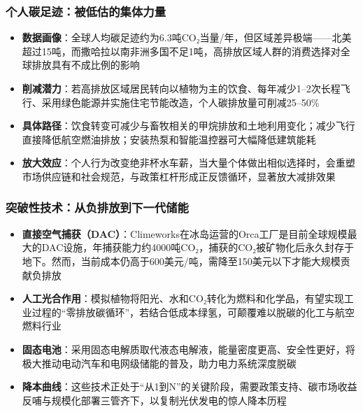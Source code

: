 \documentclass[11pt]{beamer}
\begin{document}
\begin{frame}\frametitle{个人碳足迹：被低估的集体力量}
\begin{itemize}
  \item \textbf{数据画像}：全球人均碳足迹约为\alert{6.3吨CO₂当量/年}，但区域差异极端——北美超过15吨，而撒哈拉以南非洲多国不足1吨，高排放区域人群的消费选择对全球排放具有不成比例的影响
  \item \textbf{削减潜力}：若高排放区域居民转向以\alert{植物为主的饮食}、每年减少1–2次长程飞行、采用绿色能源并实施住宅节能改造，个人碳排放量可削减\alert{25–50\%}
  \item \textbf{具体路径}：饮食转变可减少与畜牧相关的甲烷排放和土地利用变化；减少飞行直接降低航空燃油排放；安装热泵和智能温控器可大幅降低建筑能耗
  \item \textbf{放大效应}：个人行为改变绝非杯水车薪，当大量个体做出相似选择时，会重塑市场供应链和社会规范，与政策杠杆形成\alert{正反馈循环}，显著放大减排效果
\end{itemize}
\end{frame}

\begin{frame}\frametitle{突破性技术：从负排放到下一代储能}
\begin{itemize}
  \item \textbf{直接空气捕获（DAC）}：Climeworks在冰岛运营的Orca工厂是目前全球规模最大的DAC设施，年捕获能力约\alert{4000吨CO₂}，捕获的CO₂被矿物化后永久封存于地下。然而，当前成本仍高于\alert{600美元/吨}，需降至150美元以下才能大规模贡献负排放
  \item \textbf{人工光合作用}：模拟植物将阳光、水和CO₂转化为燃料和化学品，有望实现工业过程的“零排放碳循环”，若结合低成本绿氢，可颠覆难以脱碳的化工与航空燃料行业
  \item \textbf{固态电池}：采用固态电解质取代液态电解液，能量密度更高、安全性更好，将极大推动电动汽车和电网级储能的普及，助力电力系统深度脱碳
  \item \textbf{降本曲线}：这些技术正处于“从1到N”的关键阶段，需要政策支持、碳市场收益反哺与规模化部署三管齐下，以复制光伏发电的惊人降本历程
\end{itemize}
\end{frame}
\end{document}
